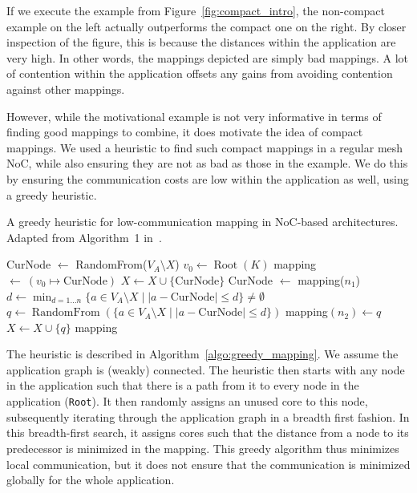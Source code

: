 If we execute the example from Figure~\ref{fig:compact_intro}, the non-compact example on the left actually outperforms the compact one on the right.
By closer inspection of the figure, this is because the distances within the application are very high.
In other words, the mappings depicted are simply bad mappings.
A lot of contention within the application offsets any gains from avoiding contention against other mappings.

However, while the motivational example is not very informative in terms of finding good mappings to combine, it does motivate the idea of compact mappings.
We used a heuristic to find such compact mappings in a regular mesh \ac{NoC}, while also ensuring they are not as bad as those in the example.
We do this by ensuring the communication costs are low within the application as well, using a greedy heuristic.

\begin{algorithm}
	\caption{A greedy heuristic for low-communication mapping in \ac{NoC}-based architectures. Adapted from Algorithm~1 in~\cite{goens_samos19}.}
	\label{algo:greedy_mapping}
	\begin{algorithmic}[1]
	  \State CurNode $\leftarrow$ RandomFrom($V_A \setminus X$)
	  \State $v_0 \leftarrow \operatorname{Root}(K)$
	  \State mapping $\leftarrow~(v_0 \mapsto \text{CurNode})$
	  \State $X \leftarrow X \cup \{ \text{CurNode} \}$
		  \State CurNode $\leftarrow$ mapping($n_1$)
		  \State $d \leftarrow \min_{d = 1 \ldots n} \{a \in V_A \setminus X \mid |a - \text{CurNode}| \leq d \} \neq \emptyset $
		  \State $q \leftarrow \operatorname{RandomFrom}(\{ a \in V_A \setminus X \mid |a - \text{CurNode}| \leq d  \})$
		  \State mapping$(n_2) \leftarrow q $
		  \State $X \leftarrow X \cup \{q\}$
	  \EndFor 
	  \Return mapping
	\end{algorithmic}
  \end{algorithm}


The heuristic is described in Algorithm~\ref{algo:greedy_mapping}.
We assume the application graph is (weakly) connected.
The heuristic then starts with any node in the application such that there is a path from it to every node in the application (\texttt{Root}).
It then randomly assigns an unused core to this node, subsequently iterating through the application graph in a breadth first fashion.
In this breadth-first search, it assigns cores such that the distance from a node to its predecessor is minimized in the mapping.
This greedy algorithm thus minimizes local communication, but it does not ensure that the communication is minimized globally for the whole application.

